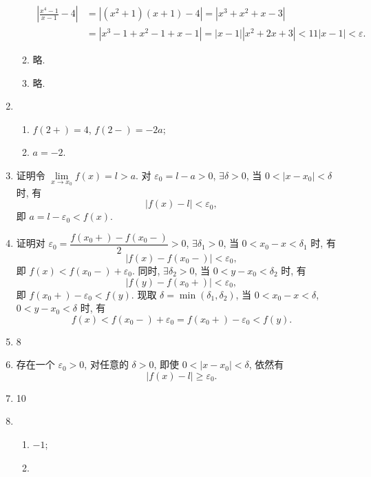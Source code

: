 \documentclass[12pt]{ctexart}
\begin{document}
\begin{enumerate}
\begin{enumerate}[(1)]
                \begin{align*}
                    \left| \frac{x^4-1}{x-1} - 4 \right| &= |(x^2+1)(x+1) - 4| = |x^3 + x^2 + x - 3| \\
                                                         &= |x^3 - 1 + x^2 - 1 + x - 1| = |x - 1||x^2 + 2x + 3| < 11|x - 1| < \varepsilon.
                \end{align*}
            \item %
                略.
            \item %
                略.
        \end{enumerate}
    \item %
        \begin{enumerate}[(1)]
            \item %
                $f(2+) = 4$, $f(2-) = -2a$;
            \item %
                $a = -2$.
        \end{enumerate}
    \item %
        {\heiti 证明}\quad 令 $\lim\limits_{x\to x_0}f(x) = l > a$. 对 $\varepsilon_0 = l - a > 0$, $\exists \delta > 0$, 当 $0 < |x - x_0| < \delta$ 时, 有
        \[
            |f(x) - l| < \varepsilon_0,    
        \]
        即 $a = l - \varepsilon_0 < f(x)$.
    \item %
        {\heiti 证明}\quad 对 $\varepsilon_0 = \dfrac{f(x_0+) - f(x_0-)}{2} > 0$, $\exists \delta_1 > 0$, 当 $0 < x_0 - x < \delta_1$ 时, 有
        \[
            |f(x) - f(x_0-)| < \varepsilon_0,    
        \]
        即 $f(x) < f(x_0-) + \varepsilon_0$. 同时, $\exists \delta_2 > 0$, 当 $0 < y - x_0 < \delta_2$ 时, 有
        \[
            |f(y) - f(x_0+)| < \varepsilon_0,    
        \]
        即 $f(x_0+) - \varepsilon_0 < f(y)$. 现取 $\delta = \min(\delta_1, \delta_2)$, 当 $0 < x_0 - x < \delta$, $0 < y - x_0 < \delta$ 时, 有
        \[
            f(x) < f(x_0-) + \varepsilon_0 = f(x_0+) - \varepsilon_0 < f(y).
        \]
    \item 8
    \item %
        存在一个 $\varepsilon_0 > 0$, 对任意的 $\delta > 0$, 即使 $0 < |x - x_0| < \delta$, 依然有
        \[
            |f(x) - l| \geqslant \varepsilon_0.
        \]
    \item 10
    \item %
        \begin{enumerate}[(1)]
            \item %
                $-1$;
            \item %

\end{enumerate}
\end{enumerate}
\end{document}
